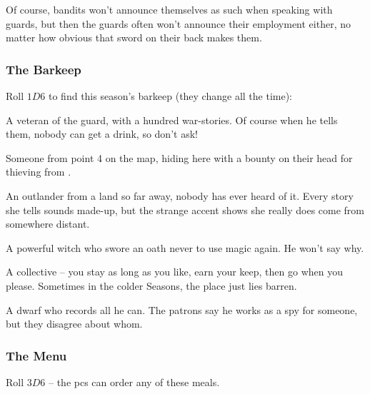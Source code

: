 \begin{multicols}{2}
Of course, bandits won't announce themselves as such when speaking with \glspl{guard}, but then the \glspl{guard} often won't announce their employment either, no matter how obvious that sword on their back makes them.

\subsubsection{The Barkeep}

Roll $1D6$ to find this season's barkeep (they change all the time):

\begin{dlist}
  \item
  A veteran of the \gls{guard}, with a hundred war-stories. Of course
  when he tells them, nobody can get a drink, so don't ask!
  \item
  Someone from point 4 on the map, hiding here with a bounty on their head for thieving from .
  \item
  An outlander from a land so far away, nobody has ever heard of it.
  Every story she tells sounds made-up, but the strange accent shows she really does come from somewhere distant.
  \item
  A powerful \gls{witch} who swore an oath never to use magic again.
  He won't say why.
  \item
  A collective -- you stay as long as you like, earn your keep, then go
  when you please. Sometimes in the colder Seasons, the place just lies
  barren.
  \item
  A dwarf who records all he can.
  The patrons say he works as a spy for someone, but they disagree about whom.
\end{dlist}

\subsubsection{The Menu}

Roll $3D6$ -- the \glspl{pc} can order any of these meals.

\newcommand\menuItem[3][(\arabic{r12} \glspl{cp})]{%
  \randomdozen%
  \randomthree%
  \randomfourB%
  \ifodd\value{enumi}
    \randomthreeC%
    \randomfour%
  \fi
  \item
  \textbf{#2:}
  #3
  #1
}


\end{multicols}
